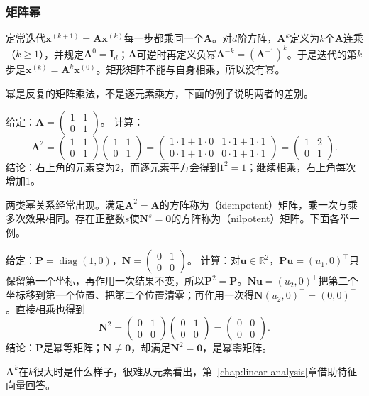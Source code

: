 \subsubsection{矩阵幂}
\label{sec:ls-matrix-power-rules}

定常迭代$\bm x^{(k+1)}=\bm A\bm x^{(k)}$每一步都乘同一个$\bm A$。对$d$阶方阵，$\bm A^k$定义为$k$个$\bm A$连乘（$k\geq1$），并规定$\bm A^0=\bm I_d$；$\bm A$可逆时再定义负幂$\bm A^{-k}=(\bm A^{-1})^k$。于是迭代的第$k$步是$\bm x^{(k)}=\bm A^k\bm x^{(0)}$。矩形矩阵不能与自身相乘，所以没有幂。

幂是反复的矩阵乘法，不是逐元素乘方，下面的例子说明两者的差别。
\begin{example}[矩阵的平方不是逐元素平方]
\label{ex:ls-matrix-square-shear}
给定：$\bm A=\left(\begin{smallmatrix}1&1\\0&1\end{smallmatrix}\right)$。
计算：
\[
 \bm A^2=\begin{pmatrix}1&1\\0&1\end{pmatrix}\begin{pmatrix}1&1\\0&1\end{pmatrix}
 =\begin{pmatrix}1\cdot1+1\cdot0&1\cdot1+1\cdot1\\0\cdot1+1\cdot0&0\cdot1+1\cdot1\end{pmatrix}
 =\begin{pmatrix}1&2\\0&1\end{pmatrix}.
\]
结论：右上角的元素变为$2$，而逐元素平方会得到$1^2=1$；继续相乘，右上角每次增加$1$。
\end{example}

两类幂关系经常出现。满足$\bm A^2=\bm A$的方阵称为（idempotent）矩阵，乘一次与乘多次效果相同。存在正整数$s$使$\bm N^s=\bm0$的方阵称为（nilpotent）矩阵。下面各举一例。
\begin{example}[幂等矩阵与幂零矩阵]
\label{ex:ls-idempotent-nilpotent}
给定：$\bm P=\operatorname{diag}(1,0)$，$\bm N=\left(\begin{smallmatrix}0&1\\0&0\end{smallmatrix}\right)$。
计算：对$\bm u\in\mathbb R^2$，$\bm P\bm u=(u_1,0)^\top$只保留第一个坐标，再作用一次结果不变，所以$\bm P^2=\bm P$。$\bm N\bm u=(u_2,0)^\top$把第二个坐标移到第一个位置、把第二个位置清零；再作用一次得$\bm N(u_2,0)^\top=(0,0)^\top$。直接相乘也得到
\[
 \bm N^2=\begin{pmatrix}0&1\\0&0\end{pmatrix}\begin{pmatrix}0&1\\0&0\end{pmatrix}=\begin{pmatrix}0&0\\0&0\end{pmatrix}.
\]
结论：$\bm P$是幂等矩阵；$\bm N\neq\bm0$，却满足$\bm N^2=\bm0$，是幂零矩阵。
\end{example}
$\bm A^k$在$k$很大时是什么样子，很难从元素看出，第~\ref{chap:linear-analysis}章借助特征向量回答。

